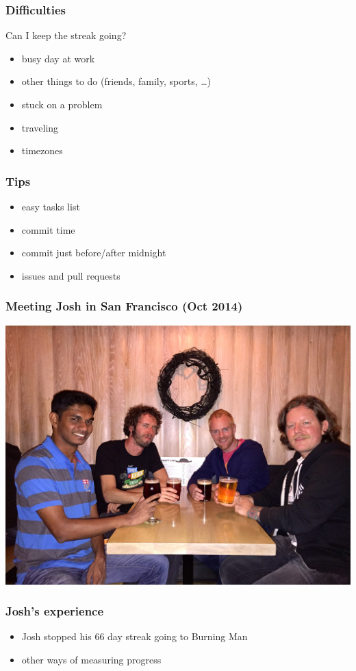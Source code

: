 \documentclass[14pt]{beamer}
\begin{document}
  \begin{frame}
    \frametitle{Difficulties}
    Can I keep the streak going?
    \begin{itemize}
      \item busy day at work
      \item other things to do (friends, family, sports, \ldots)
      \item stuck on a problem
      \item traveling
      \item timezones
    \end{itemize}
  \end{frame}
  \begin{frame}
    \frametitle{Tips}
    \begin{itemize}
      \item easy tasks list
      \item commit time
      \item commit just before/after midnight
      \item issues and pull requests
    \end{itemize}
  \end{frame}
  \begin{frame}
    \frametitle{Meeting Josh in San Francisco (Oct 2014)}
    \includegraphics[scale=.1]{josh_justin.jpg}
  \end{frame}
  \begin{frame}
    \frametitle{Josh's experience}
    \begin{itemize}
      \item Josh stopped his 66 day streak going to Burning Man
      \item other ways of measuring progress
    \end{itemize}
  \end{frame}
\end{document}
